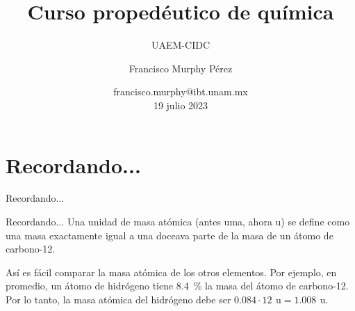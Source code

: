 \documentclass{beamer}
\author[Murphy]{Francisco Murphy Pérez\inst{1}}
\institute{1: UNAM-IBt.}
\date{francisco.murphy@ibt.unam.mx\\19 julio 2023}
\title{Curso propedéutico de química}
\subtitle{UAEM-CIDC}
\begin{document}
  \begin{frame}
    \titlepage
  \end{frame}
  \section{Recordando...}
  \begin{frame}{Recordando...}
    \begin{table}[]
      \centering
      \caption{Propiedades de partículas subatómicas.}
      \label{tab:my-table}
    \end{table}
  \end{frame}
  \begin{frame}{Recordando...}
    Una unidad de masa atómica (antes uma, ahora u) se define como una masa exactamente igual a una doceava parte de la masa de un átomo de carbono-12.\par
    Así es fácil comparar la masa atómica de los otros elementos. Por ejemplo, en promedio, un átomo de hidrógeno tiene \qty{8.4}{\percent} la masa del átomo de carbono-12. Por lo tanto, la masa atómica del hidrógeno debe ser \(0.084\cdot\qty{12}{\,\text{u}} = \qty{1.008}{\,\text{u}} \).
  \end{frame}
\end{document}
